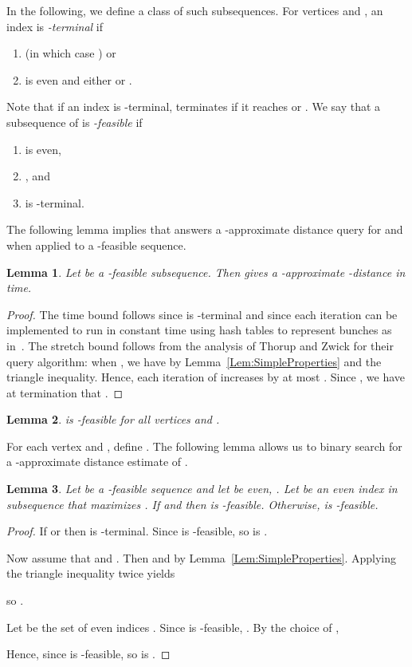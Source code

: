 \documentclass[11pt]{article}
\newtheorem{Lem}{Lemma}
\begin{document}
In the following, we define a class of such subsequences.
For vertices  and , an index  is \emph{-terminal} if
\begin{enumerate}
\item  (in which case ) or
\item  is even and either  or .
\end{enumerate}
Note that if an index  is -terminal,  terminates if it reaches  or .
We say that a subsequence  of  is \emph{-feasible} if
\begin{enumerate}
\item  is even,
\item , and
\item  is -terminal.
\end{enumerate}
The following lemma implies that  answers a -approximate distance query for  and 
when applied to a -feasible sequence.
\begin{Lem}\label{Lem:FeasibleApprox}
Let  be a -feasible subsequence. Then  gives a -approximate -distance
in  time.
\end{Lem}
\begin{proof}
The time bound follows since  is -terminal
and since each iteration can be implemented to run in constant time using
hash tables to represent bunches as in~\cite{ThorupZwick}.
The stretch bound follows from the analysis of Thorup and Zwick for their query algorithm: when , we have
 by
Lemma~\ref{Lem:SimpleProperties} and the triangle inequality. Hence,
each iteration of  increases  by at most . Since , we have at termination
that .
\end{proof}
\begin{Lem}\label{Lem:IFeasible}
 is -feasible for all vertices  and .
\end{Lem}
For each vertex  and , define .
The following lemma allows us to binary search for a -approximate distance estimate of .
\begin{Lem}\label{Lem:FeasibleRec}
Let  be a -feasible sequence and let  be even, .
Let  be an even index in subsequence
 that maximizes . If  and  then  is
-feasible. Otherwise,  is -feasible.
\end{Lem}
\begin{proof}
If  or  then  is -terminal. Since  is -feasible, so is
.

Now assume that  and . Then  and
 by Lemma~\ref{Lem:SimpleProperties}.
Applying the triangle inequality twice yields

so .

Let  be the set of even indices .
Since  is -feasible, . By the choice of ,

Hence, since  is -feasible, so is .
\end{proof}
\end{document}
